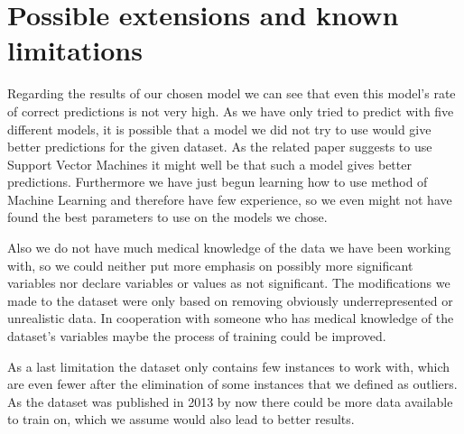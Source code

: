 \section{Possible extensions and known limitations}
Regarding the results of our chosen model we can see that even this model's rate of correct predictions is not very high. As we have only tried to predict with five different models, it is possible that a model we did not try to use would give better predictions for the given dataset. As the related paper suggests to use Support Vector Machines it might well be that such a model gives better predictions. Furthermore we have just begun learning how to use method of Machine Learning and therefore have few experience, so we even might not have found the best parameters to use on the models we chose.

Also we do not have much medical knowledge of the data we have been working with, so we could neither put more emphasis on possibly more significant variables nor declare variables or values as not significant. The modifications we made to the dataset were only based on removing obviously underrepresented or unrealistic data. In cooperation with someone who has medical knowledge of the dataset's variables maybe the process of training could be improved.

As a last limitation the dataset only contains few instances to work with, which are even fewer after the elimination of some instances that we defined as outliers. As the dataset was published in 2013 by now there could be more data available to train on, which we assume would also lead to better results.

